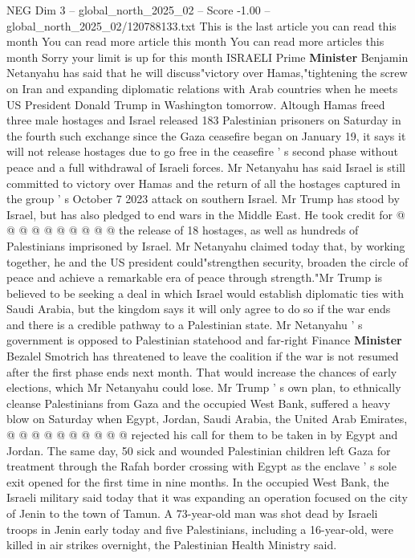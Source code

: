 \begin{textsample}{NEG Dim 3 – global\_north\_2025\_02 – Score -1.00 – global\_north\_2025\_02/120788133.txt}  \label{ex:f3_neg_162}
This is the last article you can read this month You can read more article this month You can read more articles this month Sorry your limit is up for this month ISRAELI Prime \textbf{Minister} Benjamin Netanyahu has said that he will discuss"victory over Hamas,"tightening the screw on Iran and expanding diplomatic relations with Arab countries when he meets US President Donald Trump in Washington tomorrow.
Altough Hamas freed three male hostages and Israel released 183 Palestinian prisoners on Saturday in the fourth such exchange since the Gaza ceasefire began on January 19, it says it will not release hostages due to go free in the ceasefire ' s second phase without peace and a full withdrawal of Israeli forces.
Mr Netanyahu has said Israel is still committed to victory over Hamas and the return of all the hostages captured in the group ' s October 7 2023 attack on southern Israel.
Mr Trump has stood by Israel, but has also pledged to end wars in the Middle East.
He took credit for @ @ @ @ @ @ @ @ @ @ the release of 18 hostages, as well as hundreds of Palestinians imprisoned by Israel.
Mr Netanyahu claimed today that, by working together, he and the US president could"strengthen security, broaden the circle of peace and achieve a remarkable era of peace through strength."Mr Trump is believed to be seeking a deal in which Israel would establish diplomatic ties with Saudi Arabia, but the kingdom says it will only agree to do so if the war ends and there is a credible pathway to a Palestinian state.
Mr Netanyahu ' s government is opposed to Palestinian statehood and far-right Finance \textbf{Minister} Bezalel Smotrich has threatened to leave the coalition if the war is not resumed after the first phase ends next month.
That would increase the chances of early elections, which Mr Netanyahu could lose.
Mr Trump ' s own plan, to ethnically cleanse Palestinians from Gaza and the occupied West Bank, suffered a heavy blow on Saturday when Egypt, Jordan, Saudi Arabia, the United Arab Emirates, @ @ @ @ @ @ @ @ @ @ rejected his call for them to be taken in by Egypt and Jordan.
The same day, 50 sick and wounded Palestinian children left Gaza for treatment through the Rafah border crossing with Egypt as the enclave ' s sole exit opened for the first time in nine months.
In the occupied West Bank, the Israeli military said today that it was expanding an operation focused on the city of Jenin to the town of Tamun.
A 73-year-old man was shot dead by Israeli troops in Jenin early today and five Palestinians, including a 16-year-old, were killed in air strikes overnight, the Palestinian Health Ministry said.

\end{textsample}
